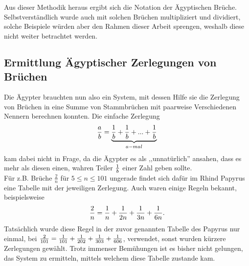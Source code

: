 	Aus dieser Methodik heraus ergibt sich die Notation der Ägyptischen Brüche. Selbstverständlich wurde auch mit solchen Brüchen multipliziert und dividiert, solche Beispiele würden aber den Rahmen dieser Arbeit sprengen, weshalb diese nicht weiter betrachtet werden.
	
\subsection{Ermittlung Ägyptischer Zerlegungen von Brüchen}
Die Ägypter brauchten nun also ein System, mit dessen Hilfe sie die Zerlegung von Brüchen in eine Summe von Stammbrüchen mit paarweise Verschiedenen Nennern berechnen konnten. Die einfache Zerlegung
$$\frac{a}{b} = \underbrace{\frac{1}{b} + \frac{1}{b} + ... +\frac{1}{b}}_{a-mal}$$
kam dabei nicht in Frage, da die Ägypter es als ,,unnatürlich'' ansahen, dass es mehr als diesen einen, wahren Teiler $\frac{1}{b}$ einer Zahl geben sollte. \cite{Burton2011}\\
Für z.B. Brüche $\frac{2}{n}$ für $5 \leq n \leq 101$ ungerade findet sich dafür im Rhind Papyrus eine Tabelle mit der jeweiligen Zerlegung. Auch waren einige Regeln bekannt, beispielsweise
$$\frac{2}{n} = \frac{1}{n} + \frac{1}{2n} + \frac{1}{3n} +\frac{1}{6n}.$$
Tatsächlich wurde diese Regel in der zuvor genannten Tabelle des Papyrus nur einmal, bei $\frac{2}{101} = \frac{1}{101}+\frac{1}{202}+\frac{1}{303}+\frac{1}{606}$, verwendet, sonst wurden kürzere Zerlegungen gewählt. Trotz immenser Bemühungen ist es bisher nicht gelungen, das System zu ermitteln, mittels welchem diese Tabelle zustande kam. \cite{Burton2011}